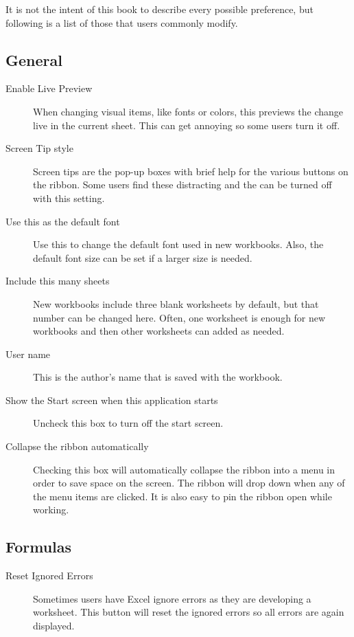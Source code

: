It is not the intent of this book to describe every possible preference, but following is a list of those that users commonly modify.

\subsection{General}

\begin{description}
	\item[Enable Live Preview] When changing visual items, like fonts or colors, this previews the change live in the current sheet. This can get annoying so some users turn it off.
	\item[Screen Tip style] Screen tips are the pop-up boxes with brief help for the various buttons on the ribbon. Some users find these distracting and the can be turned off with this setting.
	\item[Use this as the default font] Use this to change the default font used in new workbooks. Also, the default font size can be set if a larger size is needed.
	\item[Include this many sheets] New workbooks include three blank worksheets by default, but that number can be changed here. Often, one worksheet is enough for new workbooks and then other worksheets can added as needed.
	\item[User name] This is the author's name that is saved with the workbook.
	\item[Show the Start screen when this application starts] Uncheck this box to turn off the start screen.
	\item[Collapse the ribbon automatically] Checking this box will automatically collapse the ribbon into a menu in order to save space on the screen. The ribbon will drop down when any of the menu items are clicked. It is also easy to pin the ribbon open while working.
\end{description}

\subsection{Formulas}

\begin{description}
	\item[Reset Ignored Errors] Sometimes users have Excel ignore errors as they are developing a worksheet. This button will reset the ignored errors so all errors are again displayed.
\end{description}

